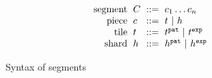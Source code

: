 \begin{figure}
\[\arraycolsep=3pt\begin{array}{rlrl}
  \text{segment} & \selection & ::= &
  \selem_1\dots\selem_n \\
  \text{piece} & \selem & ::= &
    \tile ~\vert~
    \shard \\

  \text{tile} & \tile & ::= &
      \tile^{\pat} ~\vert~
      \tile^{\expr} \\

  \text{shard} & \shard & ::= &
    \shard^{\pat} ~\vert~
    \shard^{\expr}
\end{array}\]
\caption{
  Syntax of segments
}
\label{fig:segment-syntax}
\end{figure}